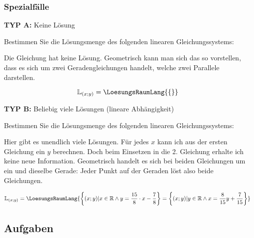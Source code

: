 \subsubsection{Spezialfälle}
\textbf{TYP A:} Keine Lösung

Bestimmen Sie die Lösungsmenge des folgenden linearen Gleichungssystems:


Die Gleichung hat keine Lösung. Geometrisch kann man sich das so vorstellen, dass es sich um zwei Geradengleichungen handelt, welche zwei Parallele darstellen.

$$\mathbb{L}_{(x;y)} = \LoesungsRaumLang{\{\}}$$

\textbf{TYP B:} Beliebig viele Lösungen (lineare Abhängigkeit)

Bestimmen Sie die Lösungsmenge des folgenden linearen Gleichungssystems:


Hier gibt es unendlich viele Lösungen. Für jedes $x$ kann ich aus der ersten Gleichung ein $y$ berechnen. Doch beim Einsetzen in die 2. Gleichung erhalte ich keine neue Information.
Geometrisch handelt es sich bei beiden Gleichungen um ein und dieselbe Gerade: Jeder Punkt auf der Geraden löst also beide Gleichungen.

$$\mathbb{L}_{(x;y)} = \LoesungsRaumLang{
\left\{(x;y)| x\in \mathbb{R} \land{} y = \frac{15}{8} \cdot{} x - \frac78\right\} =
\left\{(x;y)| y\in \mathbb{R} \land{} x = \frac8{15}y + \frac7{15}\right\}}$$


\subsection*{Aufgaben}
\newpage
